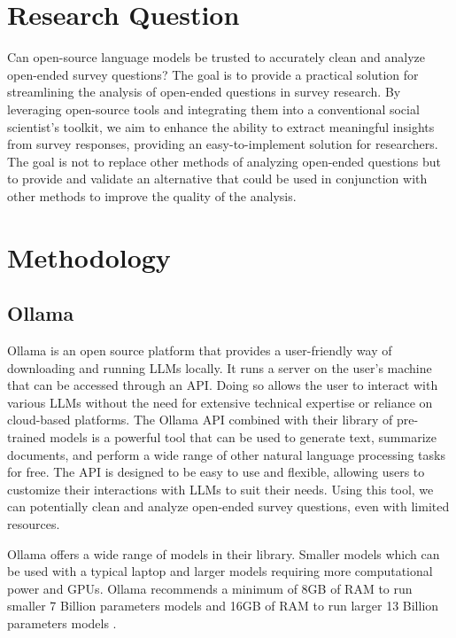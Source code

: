 \documentclass[
  authoryear,
  preprint,
  3p]{elsarticle}
\begin{document}
\section{Research Question}\label{research-question}

Can open-source language models be trusted to accurately clean and
analyze open-ended survey questions? The goal is to provide a practical
solution for streamlining the analysis of open-ended questions in survey
research. By leveraging open-source tools and integrating them into a
conventional social scientist's toolkit, we aim to enhance the ability
to extract meaningful insights from survey responses, providing an
easy-to-implement solution for researchers. The goal is not to replace
other methods of analyzing open-ended questions but to provide and
validate an alternative that could be used in conjunction with other
methods to improve the quality of the analysis.

\section{Methodology}\label{methodology}

\subsection{Ollama}\label{ollama}

Ollama is an open source platform that provides a user-friendly way of
downloading and running LLMs locally. It runs a server on the user's
machine that can be accessed through an API. Doing so allows the user to
interact with various LLMs without the need for extensive technical
expertise or reliance on cloud-based platforms. The Ollama API combined
with their library of pre-trained models is a powerful tool that can be
used to generate text, summarize documents, and perform a wide range of
other natural language processing tasks for free. The API is designed to
be easy to use and flexible, allowing users to customize their
interactions with LLMs to suit their needs. Using this tool, we can
potentially clean and analyze open-ended survey questions, even with
limited resources.

Ollama offers a wide range of models in their library. Smaller models
which can be used with a typical laptop and larger models requiring more
computational power and GPUs. Ollama recommends a minimum of 8GB of RAM
to run smaller 7 Billion parameters models and 16GB of RAM to run larger
13 Billion parameters models \citep{ollama24}.
\end{document}
